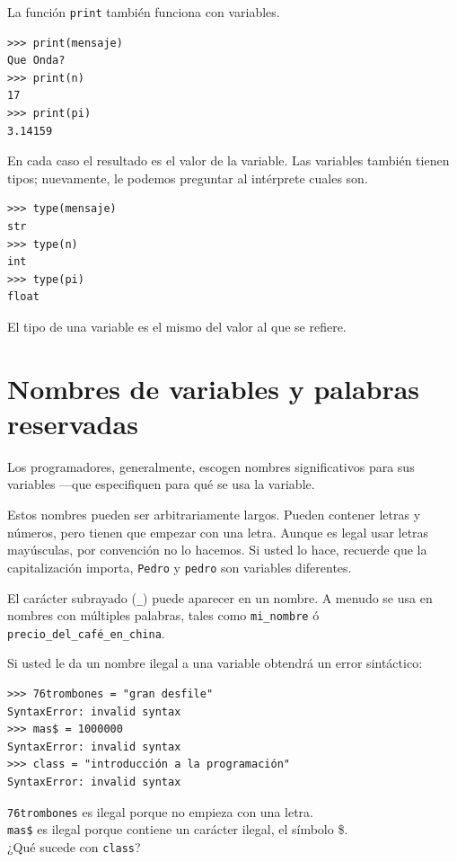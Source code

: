 La función \texttt{print} también funciona con variables.

\begin{verbatim}
>>> print(mensaje)
Que Onda?
>>> print(n)
17
>>> print(pi)
3.14159
\end{verbatim}


En cada caso el resultado es el valor de la variable. Las variables
también tienen tipos; nuevamente, le podemos preguntar al intérprete
cuales son.

\begin{verbatim}
>>> type(mensaje)
str
>>> type(n)
int
>>> type(pi)
float
\end{verbatim}


El tipo de una variable es el mismo del valor al que se refiere.

\section{Nombres de variables y palabras reservadas}

 

Los programadores, generalmente, escogen nombres significativos para
sus variables —que especifiquen para qué se usa la variable.

Estos nombres pueden ser arbitrariamente largos. Pueden contener letras
y números, pero tienen que empezar con una letra. Aunque es legal
usar letras mayúsculas, por convención no lo hacemos. Si usted lo
hace, recuerde que la capitalización importa, \texttt{Pedro} y \texttt{pedro}
son variables diferentes.

El carácter subrayado (\texttt{\_}) puede aparecer en un nombre. A
menudo se usa en nombres con múltiples palabras, tales como \texttt{mi\_nombre}
ó \texttt{precio\_del\_café\_en\_china}.


Si usted le da un nombre ilegal a una variable obtendrá un error sintáctico:

\begin{verbatim}
>>> 76trombones = "gran desfile"
SyntaxError: invalid syntax
>>> mas$ = 1000000
SyntaxError: invalid syntax
>>> class = "introducción a la programación"
SyntaxError: invalid syntax
\end{verbatim}

\texttt{76trombones} es ilegal porque no empieza con una letra.\\
\texttt{mas\$} es ilegal porque contiene un carácter ilegal, el símbolo
\$.\\
¿Qué sucede con \texttt{class}?

